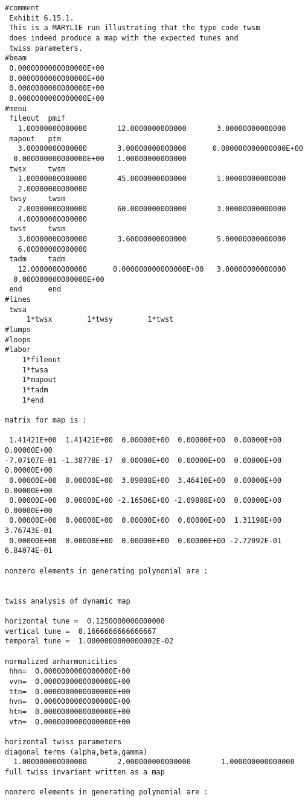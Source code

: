 \newpage
\begin{footnotesize}
\begin{verbatim}
#comment
 Exhibit 6.15.1.
 This is a MARYLIE run illustrating that the type code twsm
 does indeed produce a map with the expected tunes and
 twiss parameters.
#beam
 0.0000000000000000E+00
 0.0000000000000000E+00
 0.0000000000000000E+00
 0.0000000000000000E+00
#menu
 fileout  pmif
   1.00000000000000       12.0000000000000       3.00000000000000
 mapout   ptm
   3.00000000000000       3.00000000000000      0.000000000000000E+00
  0.000000000000000E+00   1.00000000000000
 twsx     twsm
   1.00000000000000       45.0000000000000       1.00000000000000
   2.00000000000000
 twsy     twsm
   2.00000000000000       60.0000000000000       3.00000000000000
   4.00000000000000
 twst     twsm
   3.00000000000000       3.60000000000000       5.00000000000000
   6.00000000000000
 tadm     tadm
   12.0000000000000      0.000000000000000E+00   3.00000000000000
  0.000000000000000E+00
 end      end
#lines
 twsa
     1*twsx        1*twsy        1*twst
#lumps
#loops
#labor
    1*fileout
    1*twsa
    1*mapout
    1*tadm
    1*end

matrix for map is :

 1.41421E+00  1.41421E+00  0.00000E+00  0.00000E+00  0.00000E+00  0.00000E+00
-7.07107E-01 -1.38778E-17  0.00000E+00  0.00000E+00  0.00000E+00  0.00000E+00
 0.00000E+00  0.00000E+00  3.09808E+00  3.46410E+00  0.00000E+00  0.00000E+00
 0.00000E+00  0.00000E+00 -2.16506E+00 -2.09808E+00  0.00000E+00  0.00000E+00
 0.00000E+00  0.00000E+00  0.00000E+00  0.00000E+00  1.31198E+00  3.76743E-01
 0.00000E+00  0.00000E+00  0.00000E+00  0.00000E+00 -2.72092E-01  6.84074E-01

nonzero elements in generating polynomial are :


twiss analysis of dynamic map

horizontal tune =  0.1250000000000000
vertical tune =  0.1666666666666667
temporal tune =  1.0000000000000002E-02

normalized anharmonicities
 hhn=  0.0000000000000000E+00
 vvn=  0.0000000000000000E+00
 ttn=  0.0000000000000000E+00
 hvn=  0.0000000000000000E+00
 htn=  0.0000000000000000E+00
 vtn=  0.0000000000000000E+00

horizontal twiss parameters
diagonal terms (alpha,beta,gamma)
  1.000000000000000       2.000000000000000       1.000000000000000
full twiss invariant written as a map

nonzero elements in generating polynomial are :


\end{verbatim}
\end{footnotesize}
